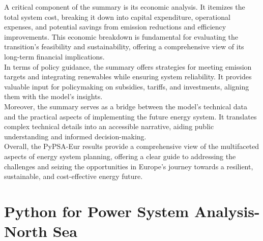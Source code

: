 A critical component of the summary is its economic analysis. It itemizes the total system cost, breaking it down into capital expenditure, operational expenses, and potential savings from emission reductions and efficiency improvements. This economic breakdown is fundamental for evaluating the transition's feasibility and sustainability, offering a comprehensive view of its long-term financial implications.\\

In terms of policy guidance, the summary offers strategies for meeting emission targets and integrating renewables while ensuring system reliability. It provides valuable input for policymaking on subsidies, tariffs, and investments, aligning them with the model's insights.\\

Moreover, the summary serves as a bridge between the model's technical data and the practical aspects of implementing the future energy system. It translates complex technical details into an accessible narrative, aiding public understanding and informed decision-making.\\

Overall, the PyPSA-Eur results provide a comprehensive view of the multifaceted aspects of energy system planning, offering a clear guide to addressing the challenges and seizing the opportunities in Europe's journey towards a resilient, sustainable, and cost-effective energy future.

\section{Python for Power System Analysis-North Sea}







